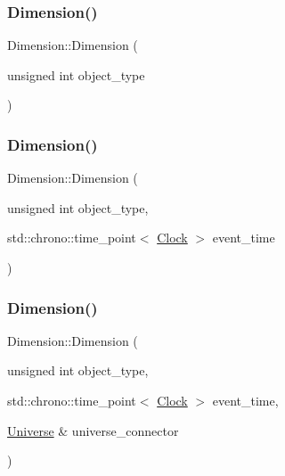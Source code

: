 \mbox{\label{classDimension_a68def81e037c1bcc005591f45c53e3a3}} 
\subsubsection{\texorpdfstring{Dimension()}{Dimension()}\hspace{0.1cm}{\footnotesize\ttfamily [2/4]}}
{\footnotesize\ttfamily Dimension\+::\+Dimension (\begin{DoxyParamCaption}\item[{unsigned int}]{object\+\_\+type }\end{DoxyParamCaption})\hspace{0.3cm}{\ttfamily [inline]}}

\mbox{\label{classDimension_ab48cbe6ca22404ab5a2c522498c38d7c}} 
\subsubsection{\texorpdfstring{Dimension()}{Dimension()}\hspace{0.1cm}{\footnotesize\ttfamily [3/4]}}
{\footnotesize\ttfamily Dimension\+::\+Dimension (\begin{DoxyParamCaption}\item[{unsigned int}]{object\+\_\+type,  }\item[{std\+::chrono\+::time\+\_\+point$<$ \mbox{\hyperlink{universe_8h_a0ef8d951d1ca5ab3cfaf7ab4c7a6fd80}{Clock}} $>$}]{event\+\_\+time }\end{DoxyParamCaption})\hspace{0.3cm}{\ttfamily [inline]}}

\mbox{\label{classDimension_a9282c4669e8f97dce010324886d79a99}} 
\subsubsection{\texorpdfstring{Dimension()}{Dimension()}\hspace{0.1cm}{\footnotesize\ttfamily [4/4]}}
{\footnotesize\ttfamily Dimension\+::\+Dimension (\begin{DoxyParamCaption}\item[{unsigned int}]{object\+\_\+type,  }\item[{std\+::chrono\+::time\+\_\+point$<$ \mbox{\hyperlink{universe_8h_a0ef8d951d1ca5ab3cfaf7ab4c7a6fd80}{Clock}} $>$}]{event\+\_\+time,  }\item[{\mbox{\hyperlink{classUniverse}{Universe}} \&}]{universe\+\_\+connector }\end{DoxyParamCaption})\hspace{0.3cm}{\ttfamily [inline]}}

